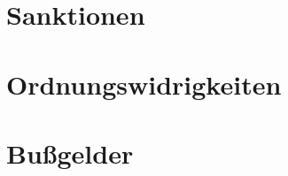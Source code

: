 \chapter{Sanktionen}\label{ch:sanktionen}

\chapter{Ordnungswidrigkeiten}\label{ch:ordnungswidrigkeiten}

\chapter{Bußgelder}\label{ch:bussgelder}
